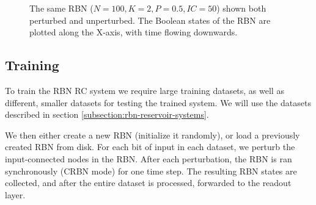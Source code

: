 \begin{figure}
  \caption[Trajectories through state space for perturbed and unperturbed RBNs]{
    The same RBN ($N=100, K=2, P=0.5, IC=50$) shown both perturbed and unperturbed.
    The Boolean states of the RBN are plotted along the X-axis,
    with time flowing downwards.
  }
\end{figure}

\subsection{Training}

To train the RBN RC system we require large training datasets,
as well as different, smaller datasets for testing the trained system.
We will use the datasets described in section \ref{subsection:rbn-reservoir-systems}.

We then either create a new RBN (initialize it randomly),
or load a previously created RBN from disk.
For each bit of input in each dataset,
we perturb the input-connected nodes in the RBN.
After each perturbation, the RBN is ran synchronously (CRBN mode) for one time step.
The resulting RBN states are collected,
and after the entire dataset is processed,
forwarded to the readout layer.

